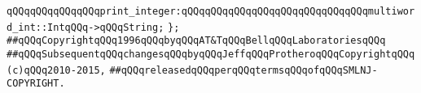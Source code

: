 \verb|qQQqqQQqqQQqqQQqprint_integer:qQQqqQQqqQQqqQQqqQQqqQQqqQQqqQQqmultiword_int::IntqQQq->qQQqString;|\newline
\newline
\verb|};|\newline
\newline
\newline
\verb|##qQQqCopyrightqQQq1996qQQqbyqQQqAT&TqQQqBellqQQqLaboratoriesqQQq|\newline
\verb|##qQQqSubsequentqQQqchangesqQQqbyqQQqJeffqQQqProtheroqQQqCopyrightqQQq(c)qQQq2010-2015,|\newline
\verb|##qQQqreleasedqQQqperqQQqtermsqQQqofqQQqSMLNJ-COPYRIGHT.|\newline

